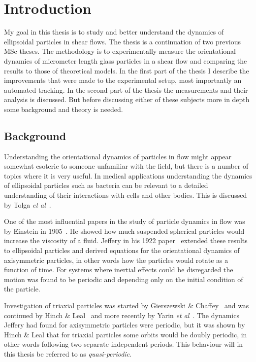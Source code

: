 \section{Introduction}
My goal in this thesis is to study and better understand the dynamics of ellipsoidal particles in shear flows. The thesis is a continuation of two previous MSc theses\cite{AntonThesis, JonasThesis}. The methodology is to experimentally measure the orientational dynamics of micrometer length glass particles in a shear flow and comparing the results to those of theoretical models. In the first part of the thesis I describe the improvements that were made to the experimental setup, most importantly an automated tracking. In the second part of the thesis the measurements and their analysis is discussed. But before discussing either of these subjects more in depth some background and theory is needed.

\subsection{Background}
Understanding the orientational dynamics of particles in flow might appear somewhat esoteric to someone unfamiliar with the field, but there is a number of topics where it is very useful. In medical applications understanding the dynamics of ellipsoidal particles such as bacteria can be relevant to a detailed understanding of their interactions with cells and other bodies. This is discussed by Tolga \emph{et al}~\cite{Tolga}. 

One of the most influential papers in the study of particle dynamics in flow was by Einstein in 1905~\cite{Einstein}. He showed how much suspended spherical particles would increase the viscosity of a fluid. Jeffery in his 1922 paper~\cite{Jeffery} extended these results to ellipsoidal  particles and derived equations for the orientational dynamics of axisymmetric particles, in other words how the particles would rotate as a function of time. For systems where inertial effects could be disregarded the motion was found to be periodic and depending only on the initial condition of the particle. 

Investigation of triaxial particles was started by Gierszewski \& Chaffey~\cite{Chaffey} and was continued by Hinch \& Leal~\cite{Leal} and more recently by Yarin \emph{et al}~\cite{Yarin}. 
The dynamics Jeffery had found for axisymmetric particles were periodic, but it was shown by Hinch \& Leal that for triaxial particles some orbits would be doubly periodic, in other words following two separate independent periods. This behaviour will in this thesis be referred to as \emph{quasi-periodic}.

